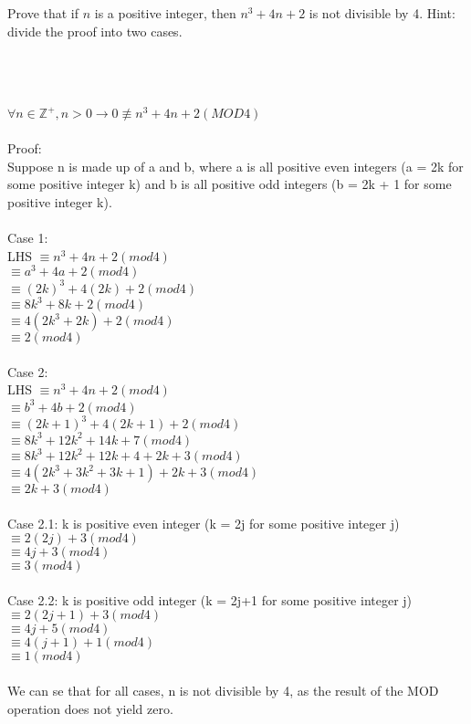 \item[6] Prove that if $n$ is a positive integer,  then $n^3 + 4n + 2$ is not  divisible by 4.
  Hint: divide the proof into two cases.
 \begin{Questions}
 \\
 \\
 {\color{NavyBlue}
 \\ $\forall n \in\mathbb{Z}^+, n > 0 \rightarrow 0 \not\equiv n^3 + 4n + 2 (MOD 4) $
 \\
 \\Proof:
 \\Suppose n is made up of a and b, where a is all positive even integers (a = 2k for some positive integer k) and b is all positive odd integers (b = 2k + 1 for some positive integer k).
 \\
 \\Case 1: 
 \\LHS $\equiv n^3 + 4n + 2 (mod 4)$
 \\$\equiv a^3 + 4a + 2 (mod 4)$
 \\$\equiv (2k)^3 + 4(2k) + 2 (mod 4)$
 \\$\equiv 8k^3 + 8k + 2 (mod 4)$
 \\$\equiv 4(2k^3 + 2k) + 2 (mod 4)$
 \\$\equiv 2 (mod 4)$
 \\
 \\Case 2:
 \\LHS $\equiv n^3 + 4n + 2 (mod 4)$
 \\$\equiv b^3 + 4b + 2 (mod 4)$
 \\$\equiv (2k+1)^3 + 4(2k+1) + 2 (mod 4)$
 \\$\equiv 8k^3+12k^2+14k+7 (mod 4)$
 \\$\equiv 8k^3+12k^2+12k+4+2k+3 (mod 4)$
 \\$\equiv 4(2k^3+3k^2+3k+1)+2k+3 (mod 4)$
 \\$\equiv 2k+3 (mod 4)$
 \\
 \\Case 2.1: k is positive even integer (k = 2j for some positive integer j)
 \\$\equiv 2(2j)+3 (mod 4)$
 \\$\equiv 4j+3 (mod 4)$
 \\$\equiv 3 (mod 4)$
 \\
 \\Case 2.2: k is positive odd integer (k = 2j+1 for some positive integer j)
 \\$\equiv 2(2j+1)+3 (mod 4)$
 \\$\equiv 4j+5 (mod 4)$
 \\$\equiv 4(j+1)+1 (mod 4)$
 \\$\equiv 1 (mod 4)$
 \\
 \\We can se that for all cases, n is not divisible by 4, as the result of the MOD operation does not yield zero.
 \\
 \\$\boxed{}$}
 \vfill\eject
 \end{Questions}
